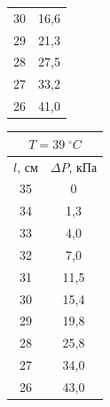 \documentclass[a4paper]{article}
\begin{document}
\begin{figure}[htb]
\begin{minipage}[b]{0.3\textwidth}
\begin{tabular}{c|c}
			30& 16,6 \\
			
			29& 21,3\\
			
			28&  27,5\\
			
			27&33,2\\
			
			26&41,0
		\end{tabular}
	\end{minipage}
	\hfil
	\begin{minipage}[b]{0.3\textwidth}

		\begin{tabular}{c|c}
			\multicolumn{2}{c}{$T=39\;^{\circ} C$}\\
			\hline
			$l$, см&$\Delta P$, кПа  \\
			\hline
			35&  0\\
			
			34& 1,3 \\
			
			33&  4,0\\
			
			32&  7,0\\
			
			31&11,5 \\
			
			30& 15,4 \\
			
			29&  19,8\\
			
			28&  25,8\\
			
			27&34,0\\
			
			26&43,0
		\end{tabular}
	\end{minipage}
\end{figure}
	
\end{document}

